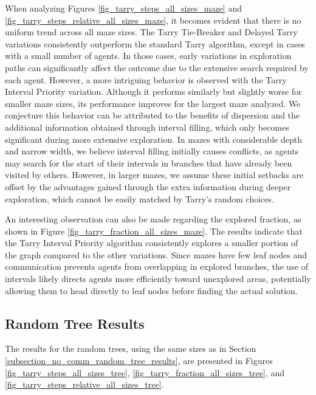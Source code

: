 When analyzing Figures \ref{fig_tarry_steps_all_sizes_maze} and \ref{fig_tarry_steps_relative_all_sizes_maze}, it becomes evident that there is no uniform trend across all maze sizes. The Tarry Tie-Breaker and Delayed Tarry variations consistently outperform the standard Tarry algorithm, except in cases with a small number of agents. In those cases, early variations in exploration paths can significantly affect the outcome due to the extensive search required by each agent. However, a more intriguing behavior is observed with the Tarry Interval Priority variation. Although it performs similarly but slightly worse for smaller maze sizes, its performance improves for the largest maze analyzed. We conjecture this behavior can be attributed to the benefits of dispersion and the additional information obtained through interval filling, which only becomes significant during more extensive exploration. In mazes with considerable depth and narrow width, we believe interval filling initially causes conflicts, as agents may search for the start of their intervals in branches that have already been visited by others. However, in larger mazes, we assume these initial setbacks are offset by the advantages gained through the extra information during deeper exploration, which cannot be easily matched by Tarry's random choices.


An interesting observation can also be made regarding the explored fraction, as shown in Figure \ref{fig_tarry_fraction_all_sizes_maze}. The results indicate that the Tarry Interval Priority algorithm consistently explores a smaller portion of the graph compared to the other variations. Since mazes have few leaf nodes and communication prevents agents from overlapping in explored branches, the use of intervals likely directs agents more efficiently toward unexplored areas, potentially allowing them to head directly to leaf nodes before finding the actual solution.


\subsection{Random Tree Results} 
\label{subsection_tarry_random_tree_results}


The results for the random trees, using the same sizes as in Section \ref{subsection_no_comm_random_tree_results}, are presented in Figures \ref{fig_tarry_steps_all_sizes_tree}, \ref{fig_tarry_fraction_all_sizes_tree}, and \ref{fig_tarry_steps_relative_all_sizes_tree}.

